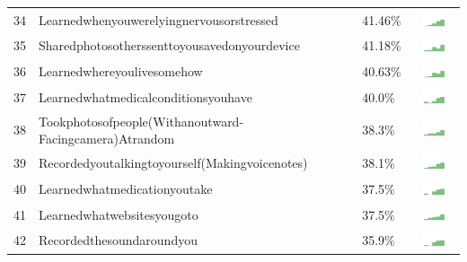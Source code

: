 \documentclass[a4paper,12pt]{article}
\begin{document}
\begin{longtable}{| p{0.5cm} | p{7cm} | p{1cm} | c |}
34 & Learnedwhenyouwerelyingnervousorstressed & 41.46\% & \includegraphics[width = 2cm, height = 0.5cm]{learnedwhenyouwerelyingnervousorstressedAPPSERVER} \\ 
35 & Sharedphotosotherssenttoyousavedonyourdevice & 41.18\% & \includegraphics[width = 2cm, height = 0.5cm]{sharedphotosotherssenttoyousavedonyourdeviceAPPSERVER} \\ 
36 & Learnedwhereyoulivesomehow & 40.63\% & \includegraphics[width = 2cm, height = 0.5cm]{learnedwhereyoulivesomehowAPPSERVER} \\ 
37 & Learnedwhatmedicalconditionsyouhave & 40.0\% & \includegraphics[width = 2cm, height = 0.5cm]{learnedwhatmedicalconditionsyouhaveAPPSERVER} \\ 
38 & Tookphotosofpeople(Withanoutward-Facingcamera)Atrandom & 38.3\% & \includegraphics[width = 2cm, height = 0.5cm]{tookphotosofpeople(withanoutward-facingcamera)atrandomAPPSERVER} \\ 
39 & Recordedyoutalkingtoyourself(Makingvoicenotes) & 38.1\% & \includegraphics[width = 2cm, height = 0.5cm]{recordedyoutalkingtoyourself(makingvoicenotes)APPSERVER} \\ 
40 & Learnedwhatmedicationyoutake & 37.5\% & \includegraphics[width = 2cm, height = 0.5cm]{learnedwhatmedicationyoutakeAPPSERVER} \\ 
41 & Learnedwhatwebsitesyougoto & 37.5\% & \includegraphics[width = 2cm, height = 0.5cm]{learnedwhatwebsitesyougotoAPPSERVER} \\ 
42 & Recordedthesoundaroundyou & 35.9\% & \includegraphics[width = 2cm, height = 0.5cm]{recordedthesoundaroundyouAPPSERVER} \\ 

\end{longtable}
\end{document}
